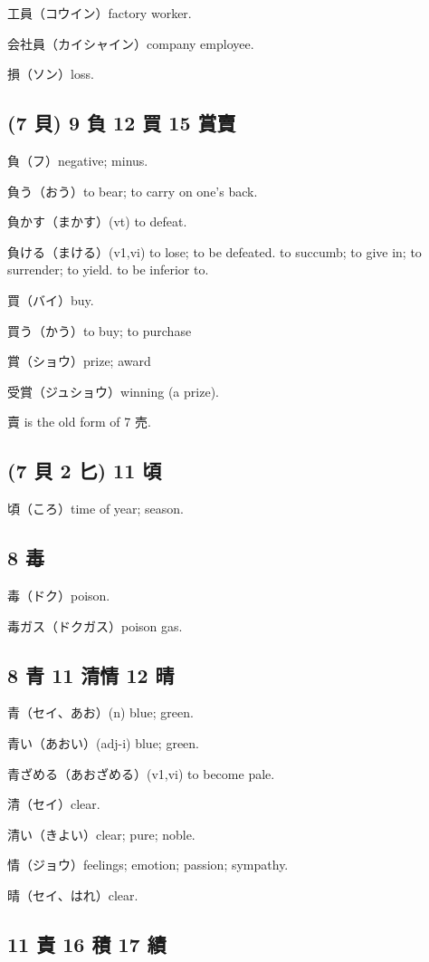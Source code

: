 工員（コウイン）factory worker.

会社員（カイシャイン）company employee.

損（ソン）loss.

\subsection{(7 貝) 9 負 12 買 15 賞賣}

負（フ）negative; minus.

負う（おう）to bear; to carry on one's back.

負かす（まかす）(vt) to defeat.

負ける（まける）(v1,vi)
to lose; to be defeated.
to succumb; to give in; to surrender; to yield.
to be inferior to.

買（バイ）buy.

買う（かう）to buy; to purchase

賞（ショウ）prize; award

受賞（ジュショウ）winning (a prize).

賣 is the old form of 7 売.

\subsection{(7 貝 2 匕) 11 頃}

頃（ころ）time of year; season.

\subsection{8 毒}

毒（ドク）poison.

毒ガス（ドクガス）poison gas.

\subsection{8 青 11 清情 12 晴}

青（セイ、あお）(n) blue; green.

青い（あおい）(adj-i) blue; green.

青ざめる（あおざめる）(v1,vi) to become pale.

清（セイ）clear.

清い（きよい）clear; pure; noble.

情（ジョウ）feelings; emotion; passion; sympathy.

晴（セイ、はれ）clear.

\subsection{11 責 16 積 17 績}

